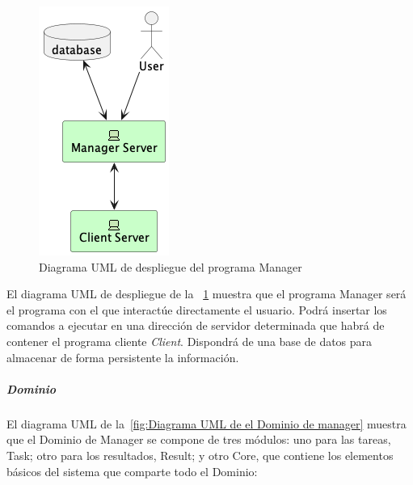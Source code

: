\begin{figure}[H]
    \centering
    \includegraphics[height=0.3\textheight]{./part/Proyecto_ejecutivo/memoria_descriptiva/descripcionDelProyecto/manager/uml/managerServerConcept}
    \caption{Diagrama UML de despliegue del programa Manager}\label{fig:diagrama_uml_de_despliegue_del_manager}
\end{figure}

El diagrama UML de despliegue de la ~\cref{fig:diagrama_uml_de_despliegue_del_manager} muestra que el programa Manager será el programa con el que interactúe directamente el usuario.
Podrá insertar los comandos a ejecutar en una dirección de servidor determinada que habrá de contener el programa cliente \textit{Client}.
Dispondrá de una base de datos para almacenar de forma persistente la información.

\subparagraph{Dominio}

El diagrama UML de la~\cref{fig:Diagrama UML de el Dominio de manager} muestra que el Dominio de Manager se compone de tres módulos: uno para las tareas, Task;
otro para los resultados, Result;
y otro Core, que contiene los elementos básicos del sistema que comparte todo el Dominio:

